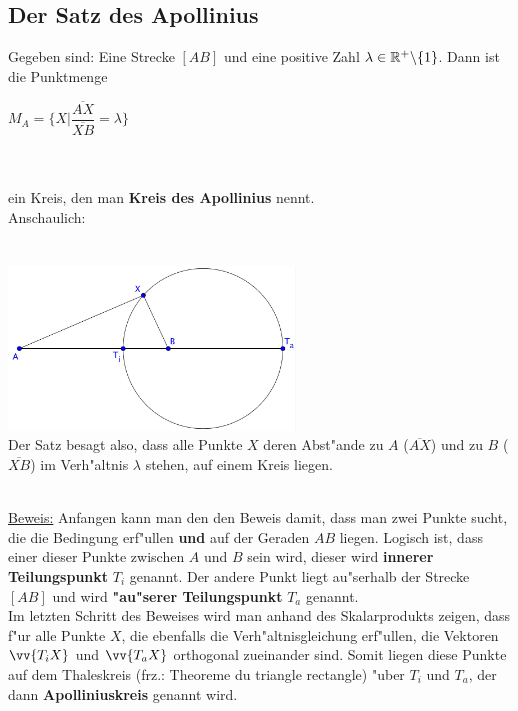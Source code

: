\subsection{Der Satz des Apollinius}
\begin{small}

\begin{Definition}
Gegeben sind: Eine Strecke $[AB]$ und eine positive Zahl $\lambda \in \mathbb{R}^{+} \backslash \{1\}$. Dann ist die Punktmenge

\begin{center}
$M_{A}=\{X| \dfrac{\overline{AX}} {\overline{XB}}=\lambda \}$\\
\end{center}
\\
\\
ein Kreis, den man \textbf{Kreis des Apollinius} nennt.\\
Anschaulich:\\
\\
\\
\includegraphics[width=3in]{kap5/Apollinus_anschaulich}
\\
Der Satz besagt also, dass alle Punkte $X$ deren Abst"ande zu $A$ ($\overline{AX}$) und zu $B$ ($\overline{XB}$) im Verh"altnis $\lambda$ stehen, auf einem Kreis liegen.\\
\end{Definition}
\newline

\begin{Beweis}
\\
\underline{Beweis:}
Anfangen kann man den den Beweis damit, dass man zwei Punkte sucht, die die Bedingung erf"ullen \textbf{und} auf der Geraden $AB$ liegen. Logisch ist, dass einer dieser Punkte zwischen $A$ und $B$ sein wird, dieser wird \textbf{innerer Teilungspunkt} $T_{i}$ genannt. Der andere Punkt liegt au"serhalb der Strecke $[AB]$ und wird \textbf{"au"serer Teilungspunkt} $T_{a}$ genannt. \\
Im letzten Schritt des Beweises wird man anhand des Skalarprodukts zeigen, dass f"ur alle Punkte $X$, die ebenfalls die Verh"altnisgleichung erf"ullen, die Vektoren $\vv{T_{i}X}$ und $\vv{T_{a}X}$ orthogonal zueinander sind. Somit liegen diese Punkte auf dem Thaleskreis (frz.: Theoreme du triangle rectangle) "uber $T_{i}$ und $T_{a}$, der dann \textbf{Apolliniuskreis} genannt wird.\\
\begin{enumerate}



\end{enumerate}
\end{Beweis}
\end{small}

